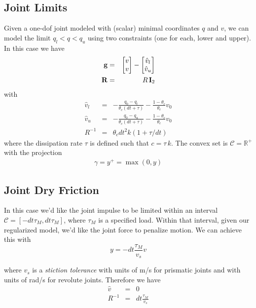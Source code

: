 \subsection{Joint Limits}

Given a one-dof joint modeled with (scalar) minimal coordinates $q$ and $v$, we
can model the limit $q_l < q < q_u $ using two constraints (one for each, lower
and upper). In this case we have
\begin{eqnarray}
	{\mathbf{g}} &=&
	\begin{bmatrix}
		v\\
		v\\
	\end{bmatrix} -
	\begin{bmatrix}
		\hat{v}_l\\
		\hat{v}_u\\
	\end{bmatrix}\\
	{\mathbf{R}} &=& R\,{\mathbf{I}}_2
\end{eqnarray}
with
\begin{eqnarray}
	\hat{v}_l&=&-\frac{q_0-q_l}{\theta_c(dt+\tau)}-\frac{1-\theta_c}{\theta_c}v_0\\
	\hat{v}_u&=&-\frac{q_0-q_u}{\theta_c(dt+\tau)}-\frac{1-\theta_c}{\theta_c}v_0\\
	R^{-1}&=&\theta_c dt^2 k(1+\tau/dt)
\end{eqnarray}
where the dissipation rate $\tau$ is defined such that $c=\tau\,k$. The convex
set is $\mathcal{C}=\mathbb{R}^+$ with the projection
\begin{eqnarray}
	\gamma = y^+= \max(0, y)
\end{eqnarray}


\subsection{Joint Dry Friction}

In this case we'd like the joint impulse to be limited within an interval
$\mathcal{C} = [-dt\tau_M, dt\tau_M]$, where $\tau_M$ is a specified load.
Within that interval, given our regularized model, we'd like the joint force to
penalize motion. We can achieve this with
\begin{equation}
	y = -dt\frac{\tau_M}{v_s}v
\end{equation}

where $v_s$ is a \textit{stiction tolerance} with units of m/s for prismatic
joints and with units of rad/s for revolute joints. Therefore we have
\begin{eqnarray}
	\hat{v} &=& 0\nonumber\\
	R^{-1} &=& dt\frac{\tau_M}{v_s}
\end{eqnarray}

